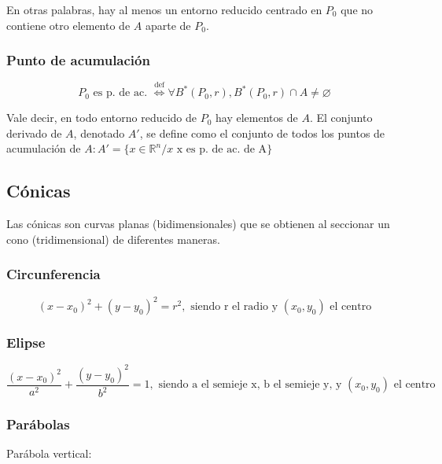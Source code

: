 \documentclass{article}
\renewcommand{\Bbb}{\mathbb}
\begin{document}
En otras palabras, hay al menos un entorno reducido centrado en $P_0$ que no contiene otro elemento de $A$ aparte de $P_0$.

\subsubsection{Punto de acumulación}

\begin{equation}
P_0 \text{ es p. de ac. } \overset{\text{def}}{\Longleftrightarrow} \forall B^*(P_0, r), B^*(P_0, r) \cap A \neq \varnothing
\end{equation}


Vale decir, en todo entorno reducido de $P_0$ hay elementos de $A$. El conjunto derivado de $A$, denotado $A'$, se define como el conjunto de todos los puntos de acumulación de $A: A' = \{ x \in \Bbb R^n / x \text{ x es p. de ac. de A} \}$

\subsection{Cónicas}

Las cónicas son curvas planas (bidimensionales) que se obtienen al seccionar un cono (tridimensional) de diferentes maneras.

\subsubsection{Circunferencia}

\begin{equation}
(x-x_0)^2 + (y-y_0)^2 = r^2, \text{ siendo r el radio y } (x_0, y_0) \text{ el centro}
\end{equation}

\subsubsection{Elipse}

\begin{equation}
\frac{(x-x_0)^2}{a^2} + \frac{(y-y_0)^2}{b^2} = 1, \text{ siendo a el semieje x, b el semieje y, y } (x_0, y_0) \text{ el centro}
\end{equation}

\subsubsection{Parábolas}

Parábola vertical:
\end{document}
